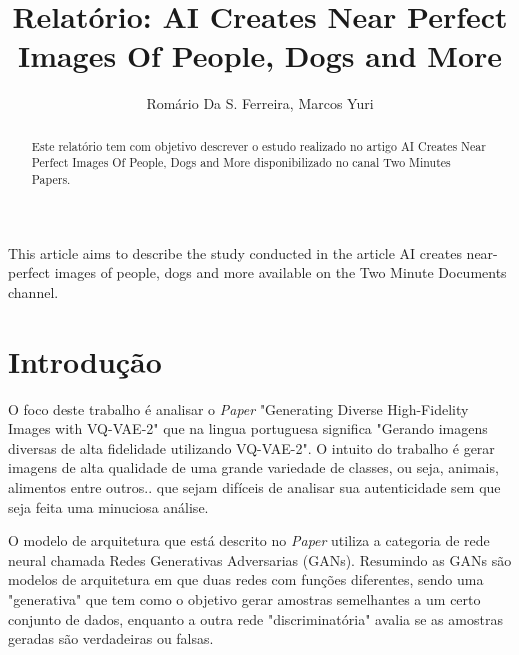 \documentclass[12pt]{article}
\title{Relatório: AI Creates Near Perfect Images Of People, Dogs and More}
\author{
    Romário Da S. Ferreira\inst{1},
    Marcos Yuri \inst{2}
}
\begin{document}
 

\maketitle

\begin{abstract}
    Este relatório tem com objetivo descrever o estudo realizado no artigo
    AI Creates Near Perfect Images Of People, Dogs and More disponibilizado no canal Two Minutes Papers.
\end{abstract}
     
\begin{resumo} 
  This article aims to describe the study conducted in the article AI creates near-perfect images of people, dogs and more available on the Two Minute Documents channel.
\end{resumo}


% 
% 
% 
\section{Introdução} \label{sec:firstpage}

O foco deste trabalho é analisar o \textit{Paper} "Generating Diverse High-Fidelity Images
with VQ-VAE-2" que na lingua portuguesa significa "Gerando imagens diversas de alta fidelidade utilizando VQ-VAE-2". O intuito do trabalho é gerar imagens de alta qualidade de uma grande variedade de classes, ou seja, animais, alimentos entre outros.. que sejam difíceis de analisar sua autenticidade sem que seja feita uma minuciosa análise.

O modelo de arquitetura que está descrito no \textit{Paper} utiliza a categoria de rede neural chamada Redes Generativas Adversarias (GANs). Resumindo as GANs são modelos de arquitetura em que duas redes com funções diferentes, sendo uma "generativa" que tem como o objetivo gerar amostras semelhantes a um certo conjunto de dados, enquanto a outra rede "discriminatória" avalia se as amostras geradas são verdadeiras ou falsas.
\end{document}
